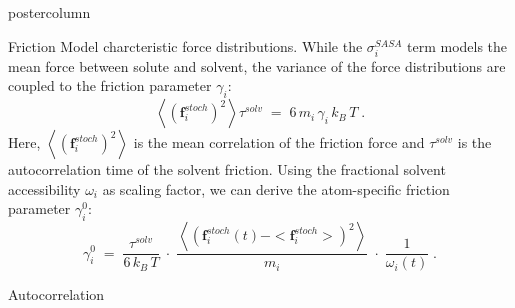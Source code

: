 \documentclass{beamer}
\newcommand{\sig}{$\sigma_i^{SASA}$}
\newcommand{\gam}{$\gamma_i^0$}
\begin{document}
\begin{frame}
\begin{columns}
\begin{column}{.45\textwidth}
\begin{beamercolorbox}[center]{postercolumn}
\begin{minipage}{.98\textwidth}
{\begin{myblock}{Friction Model}
charcteristic force distributions. While the \sig{} term models the mean
force between solute and solvent, the variance of the force distributions
are coupled to the friction parameter $\gamma_i$:
\begin{equation}
\left< (\mathbf{f}_i^{stoch})^2 \right> \tau^{solv} \; = \; 6 \, m_i \, \gamma_i \, k_B \, T \; .
\label{eq:stoch}
\end{equation}
Here, $\left< (\mathbf{f}_i^{stoch})^2 \right>$ is the mean correlation of the
friction force and $\tau^{solv}$ is the autocorrelation time of the solvent friction.
Using the fractional solvent accessibility $\omega_i$ as scaling factor,
we can derive the atom-specific friction parameter \gam:
\begin{equation}
\gamma^0_i \; = \; \frac{\tau^{solv}}{{6 \, k_B \, T}} \; \cdot \; \frac{\left< (\mathbf{f}_i^{stoch}(t) - <\mathbf{f}_i^{stoch}>)^2 \right>}{m_i} \; \cdot \; \frac{1}{\omega_i(t)} \; .
\label{eq:gamma0}
\end{equation} 
\end{myblock}\vfill
\begin{myblock}{Autocorrelation}
\begin{figure}
\begin{minipage}{1.0\textwidth}
 \\

\end{minipage}
\end{figure}
\end{myblock}}
\end{minipage}
\end{beamercolorbox}
\end{column}
\end{columns}
\end{frame}
\end{document}
